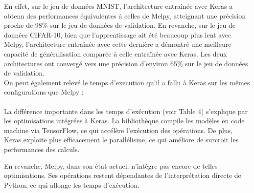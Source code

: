 \begin{multicols}{2}
En effet, sur le jeu de données MNIST, l’architecture entraînée avec Keras a obtenu des performances équivalentes à celles de Melpy, 
atteignant une précision proche de 98\% sur le jeu de données de validation. En revanche, sur le jeu de données CIFAR-10, bien que 
l’apprentissage ait été beaucoup plus lent avec Melpy, l’architecture entraînée avec cette dernière a démontré une meilleure capacité 
de généralisation comparée à celle entraînée avec Keras. Les deux architectures ont convergé vers une précision d’environ 65\% sur 
le jeu de données de validation. \\

On peut également relevé le temps d'execution qu'il a fallu à Keras sur les mêmes configurations que Melpy : \\

 \\

La différence importante dans les temps d’exécution (voir Table 4) s’explique par les optimisations intégrées à Keras. 
La bibliothèque compile les modèles en code machine via TensorFlow, ce qui accélère l’exécution 
des opérations. De plus, Keras exploite plus efficacement le parallélisme, 
ce qui améliore de surcroit les performances des calculs.

En revanche, Melpy, dans son état actuel, n’intègre pas encore de telles optimisations. 
Ses opérations restent dépendantes de l’interprétation directe de Python, ce qui allonge 
les temps d’exécution. \\

\end{multicols}